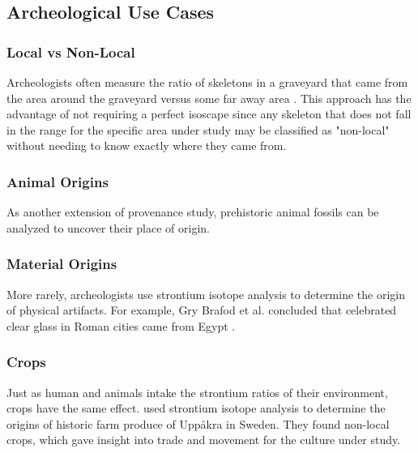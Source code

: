 \documentclass[a4paper, 12pt]{article}
\begin{document}
\subsection{Archeological Use Cases}
\subsubsection{Local vs Non-Local}
Archeologists often measure the ratio of
skeletons in a graveyard that came from the area around the graveyard versus some
far away area \citep{holt2021}. This approach has the advantage of not requiring
a perfect isoscape since any skeleton that does not fall in the range for the specific
area under study may be classified as "non-local" without needing to know exactly where
they came from.

\subsubsection{Animal Origins}
As another extension of provenance study, prehistoric animal fossils can be analyzed
to uncover their place of origin.

\subsubsection{Material Origins}
More rarely, archeologists use strontium isotope analysis to determine the origin
of physical artifacts. For example, Gry Brafod et al. concluded that celebrated
clear glass in Roman cities came from Egypt \citep{barfod2020}.

\subsubsection{Crops}
Just as human and animals intake the strontium ratios of their environment, crops
have the same effect. \cite{larsson2020} used strontium isotope analysis to determine the
origins of historic farm produce of Uppåkra in Sweden. They found non-local crops, which
gave insight into trade and movement for the culture under study.
\end{document}
